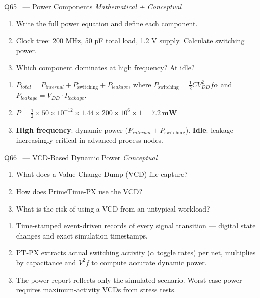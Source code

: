 \documentclass[12pt,a4paper]{article}
\newcommand{\advanced}{%
  \fbox{\textcolor{advred}{\bfseries\sffamily\small ADVANCED}}}
\begin{document}
\begin{questionbox}{Q65 \advanced\ --- Power Components \hfill\textit{Mathematical + Conceptual}}
\begin{enumerate}[label=\textbf{\alph*)}]
  \item Write the full power equation and define each component.
  \item Clock tree: 200 MHz, 50 pF total load, 1.2 V supply. Calculate switching power.
  \item Which component dominates at high frequency? At idle?
\end{enumerate}
\end{questionbox}

\begin{answerbox}
\begin{enumerate}[label=\textbf{\alph*)}]
  \item $P_{total} = P_{internal} + P_{\text{switching}} + P_{leakage}$, where
  $P_{\text{switching}} = \tfrac{1}{2}CV_{DD}^2 f\alpha$ and $P_{leakage} = V_{DD}\cdot I_{leakage}$.
  \item $P = \tfrac{1}{2}\times 50\times10^{-12}\times 1.44\times 200\times10^6\times 1 = \mathbf{7.2\,mW}$
  \item \textbf{High frequency}: dynamic power ($P_{internal}+P_{\text{switching}}$). \textbf{Idle}: leakage --- increasingly critical in advanced process nodes.
\end{enumerate}
\end{answerbox}

\begin{questionbox}{Q66 \advanced\ --- VCD-Based Dynamic Power \hfill\textit{Conceptual}}
\begin{enumerate}[label=\textbf{\alph*)}]
  \item What does a Value Change Dump (VCD) file capture?
  \item How does PrimeTime-PX use the VCD?
  \item What is the risk of using a VCD from an untypical workload?
\end{enumerate}
\end{questionbox}

\begin{answerbox}
\begin{enumerate}[label=\textbf{\alph*)}]
  \item Time-stamped event-driven records of every signal transition --- digital state changes and exact simulation timestamps.
  \item PT-PX extracts actual switching activity ($\alpha$ toggle rates) per net, multiplies by capacitance and $V^2 f$ to compute accurate dynamic power.
  \item The power report reflects only the simulated scenario. Worst-case power requires maximum-activity VCDs from stress tests.
\end{enumerate}
\end{answerbox}
\end{document}
